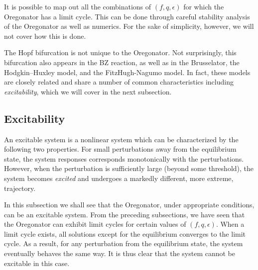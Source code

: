 \documentclass[twocolumn,amsmath,amssymb,aps]{revtex4}
\begin{document}
It is possible to map out all the combinations of $(f,q,\epsilon)$ for which the Oregonator has a limit cycle. This can be done through careful stability analysis of the Oregonator as well as numerics. For the sake of simplicity, however, we will not cover how this is done.


The Hopf bifurcation is not unique to the Oregonator. Not surprisingly, this bifurcation also appears in the BZ reaction, as well as in the Brusselator, the Hodgkin–Huxley model, and the FitzHugh-Nagumo model. In fact, these models are closely related and share a number of common characteristics including \textit{excitability}, which we will cover in the next subsection.


\subsection{Excitability}
An excitable system is a nonlinear system which can be characterized by the following two properties. For small perturbations away from the equilibrium state, the system responses corresponds monotonically with the perturbations.  However, when the perturbation is sufficiently large (beyond some threshold), the system becomes \textit{excited} and undergoes a markedly different, more extreme, trajectory.  

In this subsection we shall see that the Oregonator, under appropriate conditions, can be an excitable system. From the preceding subsections, we have seen that the Oregonator can exhibit limit cycles for certain values of $(f,q,\epsilon)$. When a limit cycle exists, all solutions except for the equilibrium converges to the limit cycle. As a result, for any perturbation from the equilibrium state, the system eventually behaves the same way. It is thus clear that the system cannot be excitable in this case. 
\end{document}
